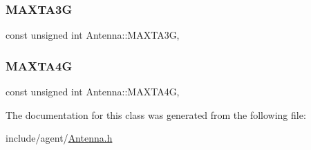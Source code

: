 \subsubsection{\texorpdfstring{M\+A\+X\+T\+A3G}{MAXTA3G}}
{\footnotesize\ttfamily const unsigned int Antenna\+::\+M\+A\+X\+T\+A3G\hspace{0.3cm}{\ttfamily [static]}, {\ttfamily [private]}}

\mbox{\label{class_antenna_a8986d0863767e330a12751aad05d9c25}} 
\subsubsection{\texorpdfstring{M\+A\+X\+T\+A4G}{MAXTA4G}}
{\footnotesize\ttfamily const unsigned int Antenna\+::\+M\+A\+X\+T\+A4G\hspace{0.3cm}{\ttfamily [static]}, {\ttfamily [private]}}



The documentation for this class was generated from the following file\+:\begin{DoxyCompactItemize}
\item 
include/agent/\hyperlink{_antenna_8h}{Antenna.\+h}\end{DoxyCompactItemize}
